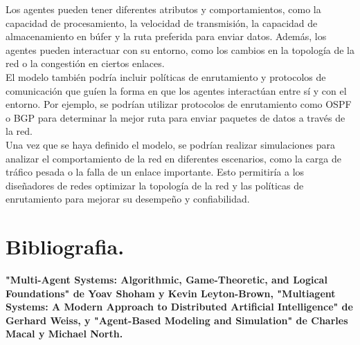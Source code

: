 \documentclass[12pt]{article}
\begin{document}
Los agentes pueden tener diferentes atributos y comportamientos, como la capacidad de procesamiento, la velocidad de transmisión, la capacidad de almacenamiento en búfer y la ruta preferida para enviar datos. Además, los agentes pueden interactuar con su entorno, como los cambios en la topología de la red o la congestión en ciertos enlaces.\\

El modelo también podría incluir políticas de enrutamiento y protocolos de comunicación que guíen la forma en que los agentes interactúan entre sí y con el entorno. Por ejemplo, se podrían utilizar protocolos de enrutamiento como OSPF o BGP para determinar la mejor ruta para enviar paquetes de datos a través de la red.\\

Una vez que se haya definido el modelo, se podrían realizar simulaciones para analizar el comportamiento de la red en diferentes escenarios, como la carga de tráfico pesada o la falla de un enlace importante. Esto permitiría a los diseñadores de redes optimizar la topología de la red y las políticas de enrutamiento para mejorar su desempeño y confiabilidad.\\





{\color{red} \section*{Bibliografia.}}

\textbf{"Multi-Agent Systems: Algorithmic, Game-Theoretic, and Logical Foundations" de Yoav Shoham y Kevin Leyton-Brown, "Multiagent Systems: A Modern Approach to Distributed Artificial Intelligence" de Gerhard Weiss, y "Agent-Based Modeling and Simulation" de Charles Macal y Michael North.}
\end{document}
